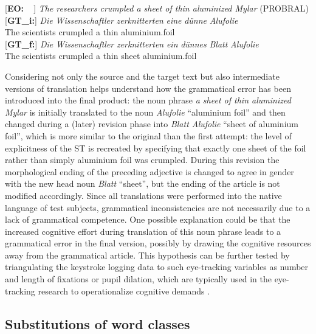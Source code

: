 \documentclass[output=paper]{LSP/langsci}
\begin{document}
\ea
\begin{xlist}
\exi{}[\textbf{EO:~~}]{ \emph{The researchers crumpled a sheet of thin aluminized Mylar} (PROBRAL)}
\exi{}[\textbf{GT\_i:}]{
\gll \emph{Die} \emph{Wissenschaftler} \emph{zerknitterten} \emph{eine} \emph{dünne} \emph{Alufolie}\\
 The scientists crumpled a thin aluminium.foil\\
}
\exi{}[\textbf{GT\_f:}]{
\gll \emph{Die} \emph{Wissenschaftler} \emph{zerknitterten} \emph{ein} \emph{dünnes} \emph{Blatt} \emph{Alufolie}\\
The scientists crumpled a thin sheet aluminium.foil\\
}
\end{xlist}
\z

Considering not only the source and the target text but also intermediate versions of translation helps understand how the grammatical error has been introduced into the final product: the noun phrase \textit{a sheet of thin aluminized Mylar} is initially translated to the noun \textit{Alufolie} “aluminium foil” and then changed during a (later) revision phase into \textit{Blatt Alufolie} “sheet of aluminium foil”, which is more similar to the original than the first attempt: the level of explicitness of the ST is recreated by specifying that exactly one sheet of the foil rather than simply aluminium foil was crumpled. During this revision the morphological ending of the preceding adjective is changed to agree in gender with the new head noun \textit{Blatt} “sheet”, but the ending of the article is not modified accordingly. Since all translations were performed into the native language of test subjects, grammatical inconsistencies are not necessarily due to a lack of grammatical competence. One possible explanation could be that the increased cognitive effort during translation of this noun phrase leads to a grammatical error in the final version, possibly by drawing the cognitive resources away from the grammatical article. This hypothesis can be further tested by triangulating the keystroke logging data to such eye-tracking variables as number and length of fixations or pupil dilation, which are typically used in the eye-tracking research to operationalize cognitive demands \citep[e.g.][]{Pavlovic2009}.

\subsection{Substitutions of word classes}
\end{document}
